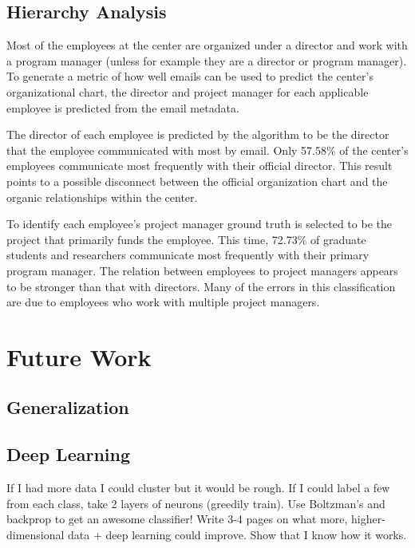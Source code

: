 \documentclass[12pt]{report}
\begin{document}
\section{Hierarchy Analysis}
Most of the employees at the center are organized under a director and work with a program manager (unless for example they are a director or program manager).
To generate a metric of how well emails can be used to predict the center's organizational chart, the director and project manager for each applicable employee is predicted from the email metadata. 

The director of each employee is predicted by the algorithm to be the director that the employee communicated with most by email.
Only 57.58\% of the center's employees communicate most frequently with their official director.
This result points to a possible disconnect between the official organization chart and the organic relationships within the center.

To identify each employee's project manager ground truth is selected to be the project that primarily funds the employee.
This time, 72.73\% of graduate students and researchers communicate most frequently with their primary program manager.
The relation between employees to project managers appears to be stronger than that with directors.
Many of the errors in this classification are due to employees who work with multiple project managers.  

\chapter{Future Work} \label{FutureWork}
\section{Generalization}
\section{Deep Learning}
If I had more data I could cluster but it would be rough.
If I could label a few from each class, take 2 layers of neurons (greedily train).
Use Boltzman's and backprop to get an awesome classifier!
Write 3-4 pages on what more, higher-dimensional data + deep learning could improve.
Show that I know how it works.
\end{document}
